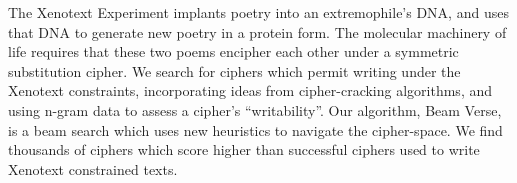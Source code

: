 The Xenotext Experiment implants poetry into an extremophile's DNA, and uses that DNA to generate new poetry in a protein form.  The molecular machinery of life requires that these two poems encipher each other under a symmetric substitution cipher. We search for ciphers which permit writing under the Xenotext constraints, incorporating ideas from cipher-cracking algorithms, and using n-gram data to assess a cipher's ``writability''. Our algorithm, Beam Verse, is a beam search which uses new heuristics to navigate the cipher-space. We find thousands of ciphers which score higher than successful ciphers used to write Xenotext constrained texts.
